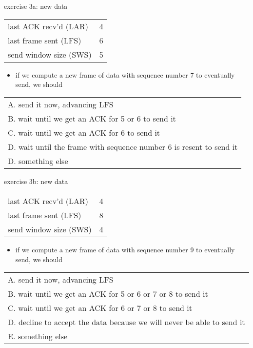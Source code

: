 \begin{frame}{exercise 3a: new data}
\begin{tabular}{l|l}
last ACK recv'd (LAR) & 4 \\
last frame sent (LFS) & 6 \\
send window size (SWS) & 5 \\
\end{tabular}
\begin{itemize}
\item if we compute a new frame of data with sequence number 7 to eventually
send, we should
\end{itemize}
\begin{tabular}{l}
A. send it now, advancing LFS \\
B. wait until we get an ACK for 5 or 6 to send it \\
C. wait until we get an ACK for 6 to send it \\
D. wait until the frame with sequence number 6 is resent to send it \\
D. something else \\
\end{tabular}
\end{frame}

\begin{frame}{exercise 3b: new data}
\begin{tabular}{l|l}
last ACK recv'd (LAR) & 4 \\
last frame sent (LFS) & 8 \\
send window size (SWS) & 4 \\
\end{tabular}
\begin{itemize}
\item if we compute a new frame of data with sequence number 9 to eventually
send, we should
\end{itemize}
\begin{tabular}{l}
A. send it now, advancing LFS \\
B. wait until we get an ACK for 5 or 6 or 7 or 8 to send it \\
C. wait until we get an ACK for 6 or 7 or 8 to send it \\
D. decline to accept the data because we will never be able to send it \\
E. something else \\
\end{tabular}
\end{frame}

